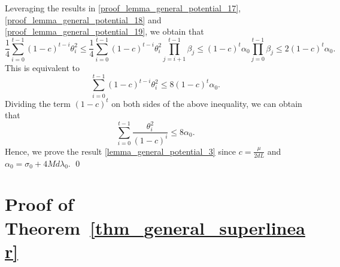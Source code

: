 \documentclass[11pt]{article}
\numberwithin{assumption}{section}
\numberwithin{remark}{section}
\numberwithin{theorem}{section}
\begin{document}
Leveraging the results in \eqref{proof_lemma_general_potential_17}, \eqref{proof_lemma_general_potential_18} and \eqref{proof_lemma_general_potential_19}, we obtain that
\begin{equation}
    \frac{1}{4}\sum_{i = 0}^{t - 1}(1 - c)^{t - i}\theta_{i}^2 \leq \frac{1}{4}\sum_{i = 0}^{t - 1}(1 - c)^{t - i}\theta_{i}^2\prod_{j = i + 1}^{t - 1}\beta_j \leq (1 - c)^t\alpha_0\prod_{j = 0}^{t - 1}\beta_j \leq 2(1 - c)^t \alpha_0.
\end{equation}
This is equivalent to
\begin{equation}
    \sum_{i = 0}^{t - 1}(1 - c)^{t - i}\theta_{i}^2 \leq 8(1 - c)^t \alpha_0.
\end{equation}
Dividing the term $(1 - c)^t$ on both sides of the above inequality, we can obtain that
\begin{equation}
\sum_{i = 0}^{t - 1}\frac{\theta^2_i}{(1 - c)^i} \leq 8\alpha_{0}.
\end{equation}
Hence, we prove the result \eqref{lemma_general_potential_3} since $c = \frac{\mu}{2dL}$ and $\alpha_0 = \sigma_0 + 4Md\lambda_0$. \hfill \qed

\section{Proof of Theorem~\ref{thm_general_superlinear}}\label{sec:proof_of_thm_general_superlinear}
\end{document}
